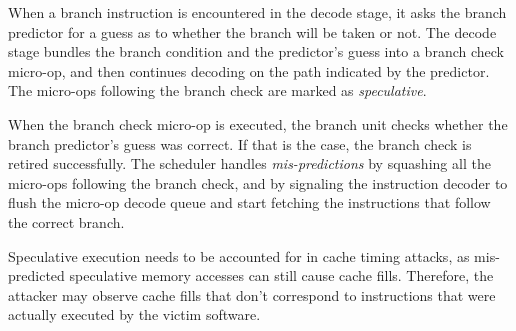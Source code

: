 When a branch instruction is encountered in the decode stage, it asks the
branch predictor for a guess as to whether the branch will be taken or not. The
decode stage bundles the branch condition and the predictor's guess into a
branch check micro-op, and then continues decoding on the path indicated by the
predictor. The micro-ops following the branch check are marked as
\textit{speculative}.

When the branch check micro-op is executed, the branch unit checks whether the
branch predictor's guess was correct. If that is the case, the branch check is
retired successfully. The scheduler handles \textit{mis-predictions} by
squashing all the micro-ops following the branch check, and by signaling the
instruction decoder to flush the micro-op decode queue and start fetching the
instructions that follow the correct branch.

Speculative execution needs to be accounted for in cache timing attacks, as
mis-predicted speculative memory accesses can still cause cache fills.
Therefore, the attacker may observe cache fills that don't correspond to
instructions that were actually executed by the victim software.



